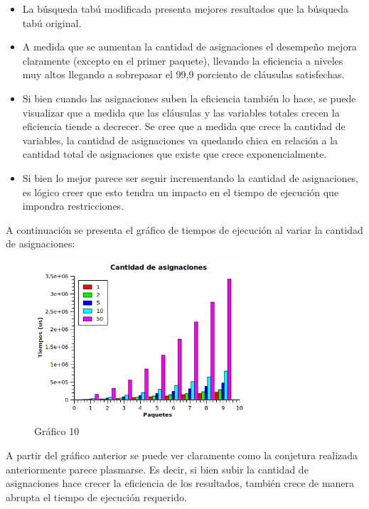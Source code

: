 \documentclass[a4paper,10pt]{article}
\begin{document}
\begin{itemize}
\item La b\'usqueda tab\'u modificada presenta mejores resultados que la b\'usqueda tab\'u original.
\item A medida que se aumentan la cantidad de asignaciones el desempe\~{n}o mejora claramente (excepto en el primer paquete), llevando la eficiencia a niveles muy altos llegando a sobrepasar el 99,9 porciento de cl\'ausulas satisfechas.
\item Si bien cuando las asignaciones suben la eficiencia tambi\'en lo hace, se puede visualizar que a medida que las cl\'ausulas y las variables totales crecen la eficiencia tiende a decrecer. Se cree que a medida que crece la cantidad de variables, la cantidad de asignaciones va quedando chica en relaci\'on a la cantidad total de asignaciones que existe que crece exponencialmente.
\item Si bien lo mejor parece ser seguir incrementando la cantidad de asignaciones, es l\'ogico creer que esto tendra un impacto en el tiempo de ejecuci\'on que impondra restricciones.
\end{itemize}


A continuaci\'on se presenta el gr\'afico de tiempos de ejecuci\'on al variar la cantidad de asignaciones:

\begin{figure}[H]
\centering
\includegraphics[width=0.7\textwidth]{graficos/combo2Tiempos.png} 
\caption{Gráfico 10}
\end{figure}


A partir del gr\'afico anterior se puede ver claramente como la conjetura realizada anteriormente parece plasmarse. Es decir, si bien subir la cantidad de asignaciones hace crecer la eficiencia de los resultados, tambi\'en crece de manera abrupta el tiempo de ejecuci\'on requerido. 
\end{document}
